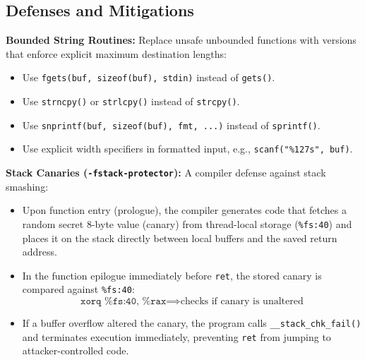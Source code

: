 \subsection{Defenses and Mitigations}

\begin{definition}
    \textbf{Bounded String Routines:}
    Replace unsafe unbounded functions with versions that enforce explicit maximum destination lengths:
    \begin{itemize}
        \item Use \texttt{fgets(buf, sizeof(buf), stdin)} instead of \texttt{gets()}.
        \item Use \texttt{strncpy()} or \texttt{strlcpy()} instead of \texttt{strcpy()}.
        \item Use \texttt{snprintf(buf, sizeof(buf), fmt, ...)} instead of \texttt{sprintf()}.
        \item Use explicit width specifiers in formatted input, e.g., \texttt{scanf("\%127s", buf)}.
    \end{itemize}
\end{definition}

\begin{definition}
    \textbf{Stack Canaries (\texttt{-fstack-protector}):}
    A compiler defense against stack smashing:
    \begin{itemize}
        \item Upon function entry (prologue), the compiler generates code that fetches a random secret 8-byte value (canary) from thread-local storage (\texttt{\%fs:40}) and places it on the stack directly between local buffers and the saved return address.
        \item In the function epilogue immediately before \texttt{ret}, the stored canary is compared against \texttt{\%fs:40}:
        $$
            \texttt{xorq \%fs:40, \%rax} \implies \text{checks if canary is unaltered}
        $$
        \item If a buffer overflow altered the canary, the program calls \texttt{\_\_stack\_chk\_fail()} and terminates execution immediately, preventing \texttt{ret} from jumping to attacker-controlled code.
    \end{itemize}
\end{definition}

